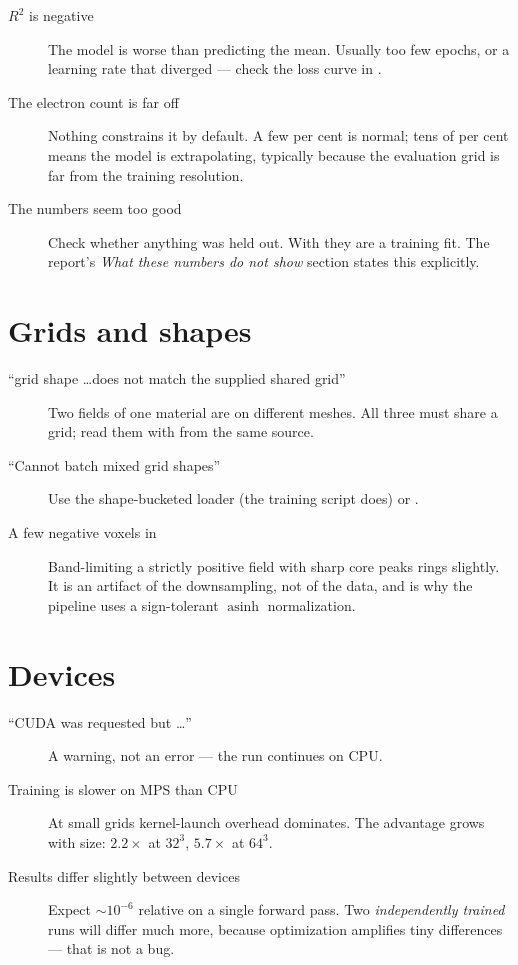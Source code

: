 \begin{description}
  \item[$R^2$ is negative] The model is worse than predicting the mean. Usually
    too few epochs, or a learning rate that diverged --- check the loss curve in
    .
  \item[The electron count is far off] Nothing constrains it by default. A few
    per cent is normal; tens of per cent means the model is extrapolating,
    typically because the evaluation grid is far from the training resolution.
  \item[The numbers seem too good] Check whether anything was held out. With
     they are a training fit. The report's
    \emph{What these numbers do not show} section states this explicitly.
\end{description}

\section{Grids and shapes}

\begin{description}
  \item[``grid shape \ldots does not match the supplied shared grid''] Two
    fields of one material are on different meshes. All three must share a grid;
    read them with  from the same source.
  \item[``Cannot batch mixed grid shapes''] Use the shape-bucketed loader
    (the training script does) or .
  \item[A few negative voxels in ] Band-limiting a strictly
    positive field with sharp core peaks rings slightly. It is an artifact of
    the downsampling, not of the data, and is why the pipeline uses a
    sign-tolerant $\operatorname{asinh}$ normalization.
\end{description}

\section{Devices}

\begin{description}
  \item[``CUDA was requested but \ldots''] A warning, not an error --- the run
    continues on CPU.
  \item[Training is slower on MPS than CPU] At small grids kernel-launch
    overhead dominates. The advantage grows with size: $2.2\times$ at $32^3$,
    $5.7\times$ at $64^3$.
  \item[Results differ slightly between devices] Expect $\sim10^{-6}$ relative
    on a single forward pass. Two \emph{independently trained} runs will differ
    much more, because optimization amplifies tiny differences --- that is not a
    bug.
\end{description}

